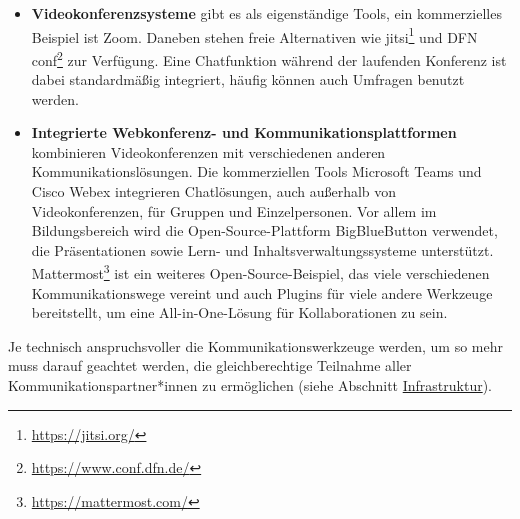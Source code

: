 \documentclass[
  11pt,
  letterpaper,
  DIV=11,
  twoside]{scrreprt}
\DeclareRobustCommand{\href}[2]{#2\footnote{\url{#1}}}
\begin{document}
\begin{itemize}
  Chats zwischen Mitarbeiter*innen dienen der niedrigschwelligen
  Kommunikation, oft als Alternative zu Telefon und E-Mail. Gruppenchats
  in Abteilungen können für einfache Fragen und Absprachen genutzt
  werden und Menschen, die mobil arbeiten, können durch ein Chatsystem
  besser integriert werden. Die Nutzung von kommerziellen Systemen, die
  noch dazu außerhalb von Europa gehostet werden, ist aus
  Datenschutzgründen nur in Ausnahmefällen zulässig (WhatsApp, Slack
  \ldots). Eine Alternative für Bibliotheken mit IT-Abteilung oder
  Rechenzentrumsunterstützung ist die Nutzung von Open-Source-Software
  wie \href{https://mibew.org/}{mibew.org} oder
  \href{https://www.rocket.chat/secure-messaging-platform}{rocket.chat}
  die selbst betrieben werden können.

  Chat ist häufig Bestandteil von integrierten Webkonferenz- und
  Kommunikationsplattformen. Auch ein Forensystem wie Discourse bietet
  eine Chat-Komponente, sodass ernsthaft abgewogen werden sollte, ob es
  wirklich eine dezidierte Chat-Lösung braucht.
\item
  \textbf{Videokonferenzsysteme} gibt es als eigenständige Tools, ein
  kommerzielles Beispiel ist Zoom. Daneben stehen freie Alternativen wie
  \href{https://jitsi.org/}{jitsi} und
  \href{https://www.conf.dfn.de/}{DFN conf} zur Verfügung. Eine
  Chatfunktion während der laufenden Konferenz ist dabei standardmäßig
  integriert, häufig können auch Umfragen benutzt werden.
\item
  \textbf{Integrierte Webkonferenz- und Kommunikationsplattformen}
  kombinieren Videokonferenzen mit verschiedenen anderen
  Kommunikationslösungen. Die kommerziellen Tools Microsoft Teams und
  Cisco Webex integrieren Chatlösungen, auch außerhalb von
  Videokonferenzen, für Gruppen und Einzelpersonen. Vor allem im
  Bildungsbereich wird die Open-Source-Plattform BigBlueButton
  verwendet, die Präsentationen sowie Lern- und
  Inhaltsverwaltungssysteme unterstützt.
  \href{https://mattermost.com/}{Mattermost} ist ein weiteres
  Open-Source-Beispiel, das viele verschiedenen Kommunikationswege
  vereint und auch Plugins für viele andere Werkzeuge bereitstellt, um
  eine All-in-One-Lösung für Kollaborationen zu sein.
\end{itemize}

Je technisch anspruchsvoller die Kommunikationswerkzeuge werden, um so
mehr muss darauf geachtet werden, die gleichberechtige Teilnahme aller
Kommunikationspartner*innen zu ermöglichen (siehe Abschnitt
\hyperref[werkzeuge-zur-kommunikation]{Infrastruktur}).
\end{document}
